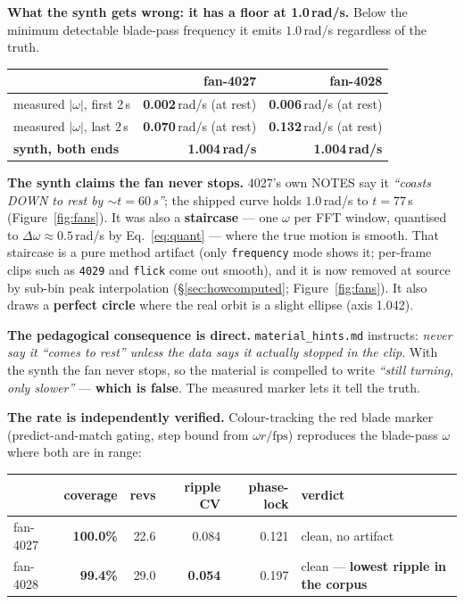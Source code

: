 \documentclass[11pt,a4paper]{article}
\begin{document}
\textbf{What the synth gets wrong: it has a floor at 1.0\,rad/s.} Below the minimum detectable
blade-pass frequency it emits $1.0$\,rad/s regardless of the truth.

\begin{center}
\begin{tabular}{lrr}
\toprule
 & fan-4027 & fan-4028 \\
\midrule
measured $|\omega|$, first 2\,s & \textbf{0.002}\,rad/s (at rest) & \textbf{0.006}\,rad/s (at rest) \\
measured $|\omega|$, last 2\,s  & \textbf{0.070}\,rad/s (at rest) & \textbf{0.132}\,rad/s (at rest) \\
\textbf{synth, both ends}       & \textbf{1.004\,rad/s} & \textbf{1.004\,rad/s} \\
\bottomrule
\end{tabular}
\end{center}

\textbf{The synth claims the fan never stops.} 4027's own NOTES say it \emph{``coasts DOWN to rest
by ${\sim}t=60$\,s''}; the shipped curve holds $1.0$\,rad/s to $t=77$\,s (Figure~\ref{fig:fans}).
It was also a \textbf{staircase} --- one $\omega$ per FFT window, quantised to
$\Delta\omega \approx 0.5$\,rad/s by Eq.~\eqref{eq:quant} --- where the true motion is smooth. That
staircase is a pure method artifact (only \texttt{frequency} mode shows it; per-frame clips such as
\texttt{4029} and \texttt{flick} come out smooth), and it is now removed at source by sub-bin peak
interpolation (\S\ref{sec:howcomputed}; Figure~\ref{fig:fans}). It also draws a \textbf{perfect
circle} where the real orbit is a slight ellipse (axis 1.042).

\textbf{The pedagogical consequence is direct.} \texttt{material\_hints.md} instructs: \emph{never
say it ``comes to rest'' unless the data says it actually stopped in the clip}. With the synth the
fan never stops, so the material is compelled to write \emph{``still turning, only slower''} ---
\textbf{which is false}. The measured marker lets it tell the truth.

\textbf{The rate is independently verified.} Colour-tracking the red blade marker (predict-and-match
gating, step bound from $\omega r/\mathrm{fps}$) reproduces the blade-pass $\omega$ where both are in
range:

\begin{center}
\begin{tabular}{lrrrrl}
\toprule
 & coverage & revs & ripple CV & phase-lock & verdict \\
\midrule
fan-4027 & \textbf{100.0\%} & 22.6 & 0.084 & 0.121 & clean, no artifact \\
fan-4028 & \textbf{99.4\%} & 29.0 & \textbf{0.054} & 0.197 & clean --- \textbf{lowest ripple in the corpus} \\
\bottomrule
\end{tabular}
\end{center}
\end{document}
